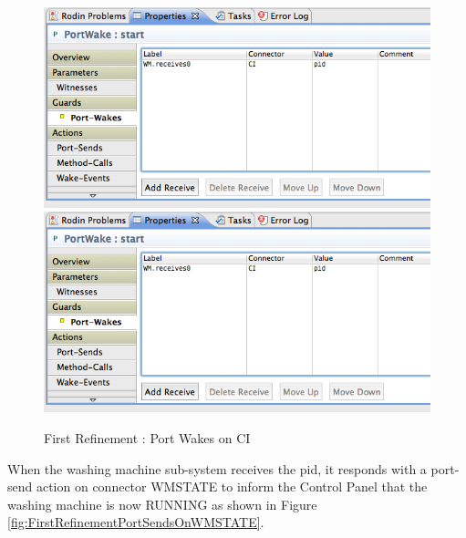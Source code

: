  \begin{figure}[!htbp]
  \centering
  \ifplastex
  \includegraphics[width=1024]{figures/image21.png}
  \else
  \includegraphics[width=1\textwidth]{figures/image21.png}
  \fi
  \caption{First Refinement : Port Wakes on CI}
  \label{fig:FirstRefinementPortWakesOnCI}
\end{figure} 

When the washing machine sub-system receives the pid, it responds with a port-send action on connector WMSTATE to inform the Control Panel that the washing machine is now RUNNING as shown in Figure \ref{fig:FirstRefinementPortSendsOnWMSTATE}.
 
